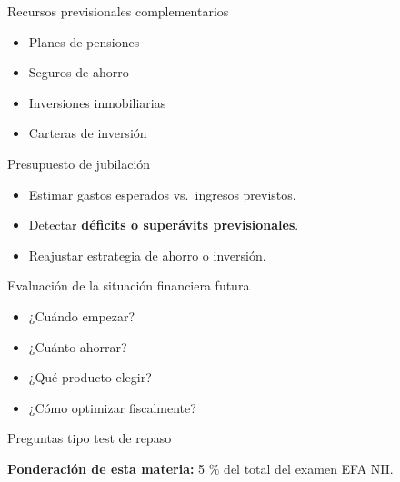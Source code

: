 \documentclass[
  ignorenonframetext,
  aspectratio=54,
  spanish,
]{beamer}
\providecommand{\tightlist}{%
  \setlength{\itemsep}{0pt}\setlength{\parskip}{0pt}}
\begin{document}
\begin{frame}{Recursos previsionales complementarios}
\label{recursos-previsionales-complementarios}
\begin{itemize}
\tightlist
\item
  Planes de pensiones
\item
  Seguros de ahorro
\item
  Inversiones inmobiliarias
\item
  Carteras de inversión
\end{itemize}
\end{frame}

\begin{frame}{Presupuesto de jubilación}
\label{presupuesto-de-jubilaciuxf3n}
\begin{itemize}
\tightlist
\item
  Estimar gastos esperados vs.~ingresos previstos.
\item
  Detectar \textbf{déficits o superávits previsionales}.
\item
  Reajustar estrategia de ahorro o inversión.
\end{itemize}
\end{frame}

\begin{frame}{Evaluación de la situación financiera futura}
\label{evaluaciuxf3n-de-la-situaciuxf3n-financiera-futura}
\begin{itemize}
\tightlist
\item
  ¿Cuándo empezar?
\item
  ¿Cuánto ahorrar?
\item
  ¿Qué producto elegir?
\item
  ¿Cómo optimizar fiscalmente?
\end{itemize}
\end{frame}

\begin{frame}{Preguntas tipo test de repaso}
\label{preguntas-tipo-test-de-repaso}
\begin{tcolorbox}[enhanced jigsaw, rightrule=.15mm, colback=white, arc=.35mm, colframe=quarto-callout-note-color-frame, bottomrule=.15mm, left=2mm, toptitle=1mm, colbacktitle=quarto-callout-note-color!10!white, leftrule=.75mm, bottomtitle=1mm, titlerule=0mm, title=\textcolor{quarto-callout-note-color}{\faInfo}\hspace{0.5em}{Nota}, opacityback=0, coltitle=black, toprule=.15mm, opacitybacktitle=0.6, breakable]

\textbf{Ponderación de esta materia:} 5 \% del total del examen EFA NII.

\end{tcolorbox}
\end{frame}
\end{document}
